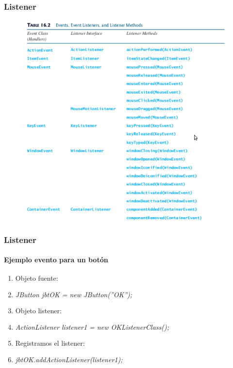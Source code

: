 \documentclass{beamer}
\begin{document}
\begin{frame}
\frametitle{Listener}
\begin{figure}
\includegraphics[scale=0.5]{imagenes/listener.png}
\end{figure}
\end{frame}

\begin{frame}
\frametitle{Listener} 
\framesubtitle{Ejemplo evento para un botón}
\begin{enumerate}[<+->]
\item Objeto fuente:
\item \emph{JButton jbtOK = new JButton(''OK'');}
\item Objeto listener:
\item \emph{ActionListener listener1 = new OKListenerClass(); }
\item Registramos el listener:
\item \emph{jbtOK.addActionListener(listener1);}
\end{enumerate}
\end{frame}
\end{document}
